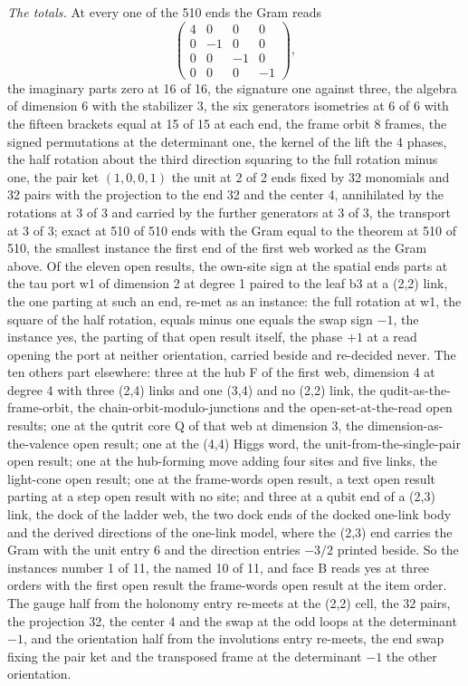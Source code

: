 \begin{chproof}
\textit{The totals.} At every one of the 510 ends the Gram reads
\begin{equation}
\begin{pmatrix} 4 & 0 & 0 & 0 \\ 0 & -1 & 0 & 0 \\ 0 & 0 & -1 & 0 \\ 0 & 0 & 0 & -1 \end{pmatrix},
\end{equation}
the imaginary parts zero at 16 of 16, the signature one against three, the algebra of dimension 6 with the stabilizer 3, the six generators isometries at 6 of 6 with the fifteen brackets equal at 15 of 15 at each end, the frame orbit 8 frames, the signed permutations at the determinant one, the kernel of the lift the 4 phases, the half rotation about the third direction squaring to the full rotation minus one, the pair ket $(1, 0, 0, 1)$ the unit at 2 of 2 ends fixed by 32 monomials and 32 pairs with the projection to the end 32 and the center 4, annihilated by the rotations at 3 of 3 and carried by the further generators at 3 of 3, the transport at 3 of 3; exact at 510 of 510 ends with the Gram equal to the theorem at 510 of 510, the smallest instance the first end of the first web worked as the Gram above. Of the eleven open results, the own-site sign at the spatial ends parts at the tau port w1 of dimension 2 at degree 1 paired to the leaf b3 at a (2,2) link, the one parting at such an end, re-met as an instance: the full rotation at w1, the square of the half rotation, equals minus one equals the swap sign $-1$, the instance yes, the parting of that open result itself, the phase $+1$ at a read opening the port at neither orientation, carried beside and re-decided never. The ten others part elsewhere: three at the hub F of the first web, dimension 4 at degree 4 with three (2,4) links and one (3,4) and no (2,2) link, the qudit-as-the-frame-orbit, the chain-orbit-modulo-junctions and the open-set-at-the-read open results; one at the qutrit core Q of that web at dimension 3, the dimension-as-the-valence open result; one at the (4,4) Higgs word, the unit-from-the-single-pair open result; one at the hub-forming move adding four sites and five links, the light-cone open result; one at the frame-words open result, a text open result parting at a step open result with no site; and three at a qubit end of a (2,3) link, the dock of the ladder web, the two dock ends of the docked one-link body and the derived directions of the one-link model, where the (2,3) end carries the Gram with the unit entry 6 and the direction entries $-3/2$ printed beside. So the instances number 1 of 11, the named 10 of 11, and face B reads yes at three orders with the first open result the frame-words open result at the item order. The gauge half from the holonomy entry re-meets at the (2,2) cell, the 32 pairs, the projection 32, the center 4 and the swap at the odd loops at the determinant $-1$, and the orientation half from the involutions entry re-meets, the end swap fixing the pair ket and the transposed frame at the determinant $-1$ the other orientation.


\end{chproof}
